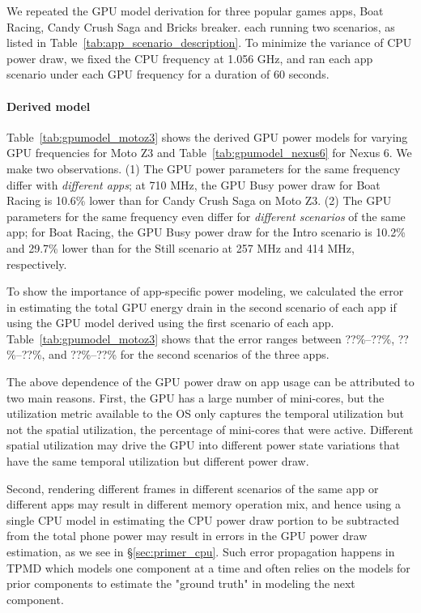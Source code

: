 
We repeated the GPU model derivation for three
popular games apps, Boat Racing, Candy Crush Saga and Bricks breaker.
each running two scenarios, as listed in Table~\ref{tab:app_scenario_description}.
To minimize the variance of CPU power draw, we fixed the CPU frequency at 1.056 GHz,
and ran each app scenario under each GPU frequency for a duration of 60 seconds.

\paragraph{Derived model}
Table~\ref{tab:gpumodel_motoz3} shows the derived GPU power models for varying GPU frequencies for Moto Z3 and Table~\ref{tab:gpumodel_nexus6} for Nexus 6.
We make two observations.
(1) The GPU power parameters for the same frequency differ with {\it different apps}; at 710 MHz, the GPU Busy power draw for Boat Racing is 10.6\% lower than for Candy Crush Saga on Moto Z3.
(2) The GPU parameters for the same frequency even differ for {\it different scenarios} 
of the same app; for Boat Racing, the GPU Busy power draw
for the Intro scenario is 10.2\% and 29.7\% lower than for the Still scenario
at 257 MHz and 414 MHz, respectively.

To show the importance of app-specific power modeling, we calculated the error
in estimating the total GPU energy drain in the second scenario of each app 
if using the GPU model derived using the first scenario of each app.
Table~\ref{tab:gpumodel_motoz3} shows that the error ranges between 
??\%--??\%, ??\%--??\%, and ??\%--??\% for the second scenarios of the three apps.


The above dependence of the GPU power draw on app usage can be attributed  to two main reasons.
First, the GPU has a large number of mini-cores, but the utilization metric available to the OS only captures the temporal utilization but not the spatial utilization, \ie the percentage of mini-cores that were active.
Different spatial utilization may drive the GPU into different power state variations that have the same temporal utilization but different power draw.

Second, rendering different frames in different scenarios of the same app or different apps may result in different memory operation mix, and hence using a single CPU model in estimating the CPU power draw portion to be subtracted from the total phone power 
may result in errors in the GPU power draw  estimation, as we see in \S\ref{sec:primer_cpu}. 
Such error propagation happens in TPMD which models one component at a time
and often relies on the models for prior components to estimate the "ground truth" in modeling  the next component. 

